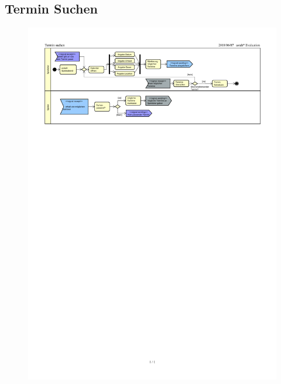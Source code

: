\subsection*{Termin Suchen}
\begin{figure}[h!]
	\centering
	\includegraphics[width=0.8\linewidth]{docs/3_Aktivitaetsdiagramme/Markus/Termin_Suchen.pdf}
	\label{fig:ActDia_Termin_Suchen}
\end{figure}

\vfill